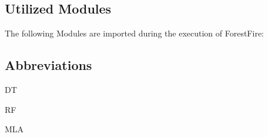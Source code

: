 \documentclass[letterpaper,10pt,english]{sphinxmanual}
\begin{document}
\subsection{Utilized Modules}
\label{\detokenize{Overview:utilized-modules}}
The following Modules are imported during the execution of ForestFire:

\begin{sphinxVerbatim}[commandchars=\\\{\}]
   
   
   
\end{sphinxVerbatim}


\subsection{Abbreviations}
\label{\detokenize{Overview:abbreviations}}\label{\detokenize{Overview:dt}}\begin{description}
\item[{DT}] \leavevmode
{\hyperref[\detokenize{Overview:term-decision-tree}]{}}

\end{description}
\label{\detokenize{Overview:rf}}\begin{description}
\item[{RF}] \leavevmode
{\hyperref[\detokenize{Overview:term-random-forest}]{}}

\end{description}
\label{\detokenize{Overview:mla}}\begin{description}
\item[{MLA}] \leavevmode
{\hyperref[\detokenize{Overview:term-machine-learning-algorithm}]{}}

\end{description}
\end{document}
